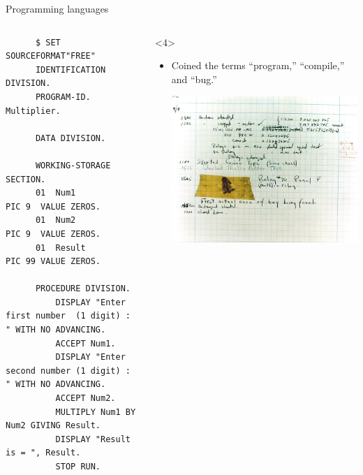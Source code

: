 \documentclass[aspectratio=169]{beamer}
\begin{document}
\begin{frame}[fragile]{Programming languages}
\begin{columns}
\begin{onlyenv}
\begin{itemize}
\vspace{0.1 cm}
\tiny
\begin{verbatim}
      $ SET SOURCEFORMAT"FREE"
      IDENTIFICATION DIVISION.
      PROGRAM-ID.  Multiplier.

      DATA DIVISION.

      WORKING-STORAGE SECTION.
      01  Num1                                PIC 9  VALUE ZEROS.
      01  Num2                                PIC 9  VALUE ZEROS.
      01  Result                              PIC 99 VALUE ZEROS.

      PROCEDURE DIVISION.
          DISPLAY "Enter first number  (1 digit) : " WITH NO ADVANCING.
          ACCEPT Num1.
          DISPLAY "Enter second number (1 digit) : " WITH NO ADVANCING.
          ACCEPT Num2.
          MULTIPLY Num1 BY Num2 GIVING Result.
          DISPLAY "Result is = ", Result.
          STOP RUN.
\end{verbatim}
\normalsize
\end{itemize}
\end{onlyenv}\begin{onlyenv}<4>
\begin{itemize}
\item Coined the terms ``program,'' ``compile,'' and ``bug.''

\begin{center}
\includegraphics[width=0.7\linewidth]{PLOTS/First_Computer_Bug,_1945.jpg}
\end{center}
\end{itemize}
\end{onlyenv}


\end{columns}
\end{frame}
\end{document}
